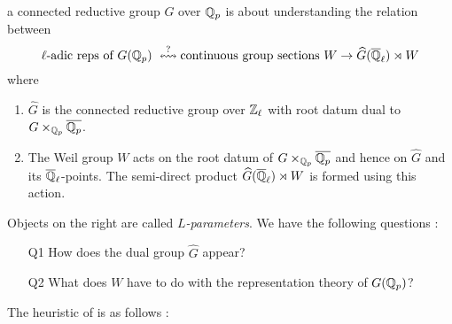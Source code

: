 \documentclass{article}
\begin{document}
a connected reductive group $G$ over $\mathbb{Q}_p$ 
is about understanding the relation between \[
  \text{$\ell$-adic reps of $G(\mathbb{Q}_p)$ }
  \overset{?}{\leftrightsquigarrow}
  \text{continuous group sections 
    $W \to \widehat{G}(\overline{\mathbb{Q}}_\ell) \rtimes W$}
\]
where \begin{enumerate}
  \item $\widehat{G}$ is the connected reductive group over $\mathbb{Z}_\ell$
  with root datum dual to $G \times_{\mathbb{Q}_p} \overline{\mathbb{Q}_p}$.
  \item The Weil group $W$ acts on the root datum of 
  $G \times_{\mathbb{Q}_p} \overline{\mathbb{Q}_p}$
  and hence on $\widehat{G}$ and its $\overline{\mathbb{Q}}_\ell$-points.
  The semi-direct product $\widehat{G}(\overline{\mathbb{Q}}_\ell) \rtimes W$
  is formed using this action.
\end{enumerate}
Objects on the right are called \emph{$L$-parameters}.
\cite[Def. VIII.1.1.]{FS24}
We have the following questions : 
\begin{enumerate}
  \item [Q1] How does the dual group $\widehat{G}$ appear?
  \item [Q2] What does $W$ have to do with the representation theory of 
  $G(\mathbb{Q}_p)$?
\end{enumerate}
The heuristic of \cite{FS24} is as follows : 
\end{document}
